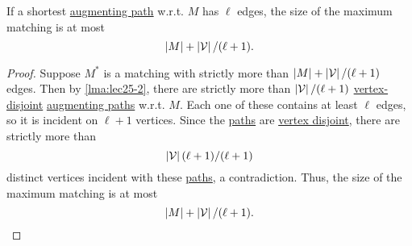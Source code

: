 \begin{lemma}\label{lma:lec25-5}
	If a shortest \hyperref[def:augmenting-path]{augmenting path} w.r.t. \(M\) has \(\ell \) edges, the size of the maximum matching is at most
	\[
		\left\vert M \right\vert + \left\vert \mathcal{\MakeUppercase{v}}  \right\vert / (\ell +1).
	\]
\end{lemma}
\begin{proof}
	Suppose \(M^{\ast} \) is a matching with strictly more than \(\left\vert M \right\vert + \left\vert \mathcal{\MakeUppercase{V}}  \right\vert / (\ell +1)\) edges.
	Then by \autoref{lma:lec25-2}, there are strictly more than \(\left\vert \mathcal{\MakeUppercase{V}}  \right\vert / (\ell +1)\) \hyperref[def:vertex-independent]{vertex-disjoint}
	\hyperref[def:augmenting-path]{augmenting paths} w.r.t. \(M\). Each one of these contains at least \(\ell \) edges, so it is incident on \(\ell +1\) vertices. Since the
	\hyperref[def:path]{paths} are \hyperref[def:vertex-independent]{vertex disjoint}, there are strictly more than
	\[
		\left\vert \mathcal{\MakeUppercase{v}}  \right\vert (\ell + 1) / (\ell +1)
	\]
	distinct vertices incident with these \hyperref[def:path]{paths}, a contradiction. Thus, the size of the maximum matching is at most
	\[
		\left\vert M \right\vert + \left\vert \mathcal{\MakeUppercase{v}}  \right\vert / (\ell +1).
	\]
\end{proof}

